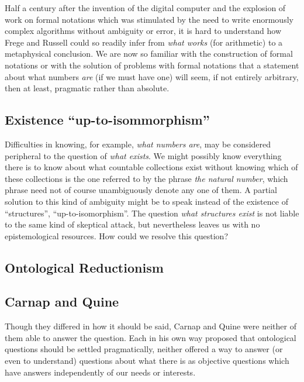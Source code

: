 \documentclass{rbjk}
\begin{document}
\begin{article}
Half a century after the invention of the digital computer and the explosion of work on formal notations which was stimulated by the need to write enormously complex algorithms without ambiguity or error, it is hard to understand how Frege and Russell could so readily infer from {\it what works} (for arithmetic) to a metaphysical conclusion.
We are now so familiar with the construction of formal notations or with the solution of problems with formal notations that a statement about what numbers {\it are} (if we must have one) will seem, if not entirely arbitrary, then at least, pragmatic rather than absolute.

\subsection{Existence ``up-to-isommorphism''}

Difficulties in knowing, for example, {\it what numbers are}, may be considered peripheral to the question of {\it what exists}.
We might possibly know everything there is to know about what countable collections exist without knowing which of these collections is the one referred to by the phrase {\it the natural number}, which phrase need not of course unambiguously denote any one of them.
A partial solution to this kind of ambiguity might be to speak instead of the existence of ``structures'', ``up-to-isomorphism''.
The question {\it what structures exist} is not liable to the same kind of skeptical attack, but nevertheless leaves us with no epistemological resources.
How could we resolve this question?

\subsection{Ontological Reductionism}

\subsection{Carnap and Quine}

Though they differed in how it should be said, Carnap \cite{Carnap50} and Quine \cite{Quine51} \cite{Quine53} were neither of them able to answer the question.
Each in his own way proposed that ontological questions should be settled pragmatically, neither offered a way to answer (or even to understand) questions about what there is as objective questions which have answers independently of our needs or interests.


\end{article}
\end{document}
